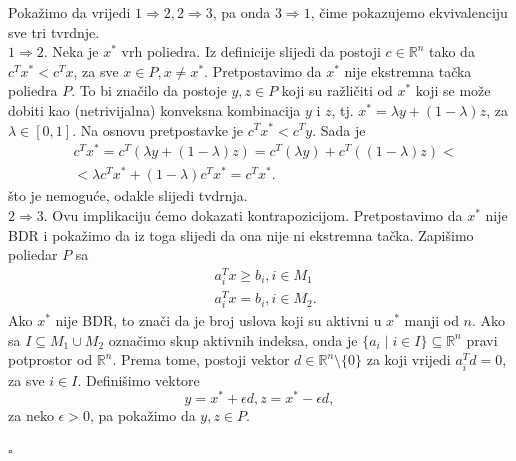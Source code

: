 \documentclass[a4paper, utf8, 11pt, colorlinks]{article}
\newenvironment{proof}{{Dokaz:}}{\hfill$\square$}
\begin{document}
\begin{proof}
      Pokažimo da vrijedi $1 \Rightarrow 2, 2 \Rightarrow 3$, pa onda $3 \Rightarrow 1$, čime pokazujemo ekvivalenciju sve tri tvrdnje. \\
      $1 \Rightarrow 2$. Neka je $x^*$ vrh poliedra. Iz definicije slijedi da 
      postoji $c\in \mathbb{R}^n$ tako da $c^Tx^* < c^T x$, za sve $x \in P, x \neq x^*$. Pretpostavimo da $x^*$ nije ekstremna tačka poliedra $P$. To bi značilo da postoje $y,z \in P$ koji su ražličiti od $x^*$ koji se može dobiti kao (netrivijalna) konveksna kombinacija $y$ i $z$, tj. $x^* = \lambda y + (1 - \lambda) z $, za $\lambda \in [0,1 ]$. Na osnovu pretpostavke je $c^T x^* < c^T y$. Sada je 
      \begin{align}
          &c^T x^* = c^T ( \lambda y + (1 - \lambda) z )  = c^T( \lambda y) + c^T((1- \lambda) z) < \nonumber \\
          &< \lambda c^T x^* + ( 1 - \lambda) c^T x^* = c^T x^*.
      \end{align}
      što je nemoguće, odakle slijedi tvdrnja. \\
      $2 \Rightarrow 3$.
       Ovu implikaciju ćemo dokazati kontrapozicijom. Pretpostavimo da $x^*$ nije BDR i pokažimo da iz toga slijedi da ona nije ni ekstremna tačka.
       Zapišimo poliedar $P$ sa 
       \begin{align}
            & a_i^T x \geq b_i, i \in M_1 \\
            & a_i^T x  = b_i, i \in M_2.
       \end{align}
       Ako $x^*$ nije BDR, to znači da je broj uslova koji su aktivni u $x^*$ manji od $n$. 
       Ako sa $I \subseteq M_1 \cup M_2$ označimo skup aktivnih indeksa, onda 
       je $\{ a_i \mid i \in I \} \subseteq \mathbb{R}^n$ pravi potprostor od $\mathbb{R}^n$.  Prema tome, postoji vektor $d \in \mathbb{R}^n \setminus \{0\}$ za koji vrijedi $a_i^T d = 0$, za sve $i \in I$. Definišimo vektore 
       $$ y = x^* + \epsilon d, z = x^* - \epsilon d, $$
       za neko $\epsilon > 0$, pa pokažimo da $y, z \in P$.
       

\end{proof}
\end{document}
